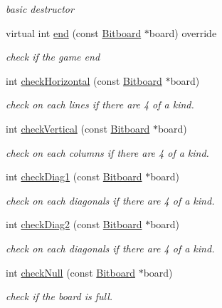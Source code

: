 \begin{DoxyCompactItemize}
\begin{DoxyCompactList}\small\item\em basic destructor \end{DoxyCompactList}\item 
virtual int \hyperlink{class_connect4_ad011fd3ade939f1d7e8e54b1ad62188e}{end} (const \hyperlink{class_bitboard}{Bitboard} $\ast$board) override
\begin{DoxyCompactList}\small\item\em check if the game end \end{DoxyCompactList}\item 
int \hyperlink{class_connect4_a390df9947d9a3dd5ad6d635e04e34ad5}{check\+Horizontal} (const \hyperlink{class_bitboard}{Bitboard} $\ast$board)
\begin{DoxyCompactList}\small\item\em check on each lines if there are 4 of a kind. \end{DoxyCompactList}\item 
int \hyperlink{class_connect4_afea80666abe65e9ede6a60e2f8ee97c3}{check\+Vertical} (const \hyperlink{class_bitboard}{Bitboard} $\ast$board)
\begin{DoxyCompactList}\small\item\em check on each columns if there are 4 of a kind. \end{DoxyCompactList}\item 
int \hyperlink{class_connect4_a5d1ec2a0b2e3748d09d0db18ba4e2b03}{check\+Diag1} (const \hyperlink{class_bitboard}{Bitboard} $\ast$board)
\begin{DoxyCompactList}\small\item\em check on each diagonals if there are 4 of a kind. \end{DoxyCompactList}\item 
int \hyperlink{class_connect4_a53cb51ebd88edd4b7805a69622900bd5}{check\+Diag2} (const \hyperlink{class_bitboard}{Bitboard} $\ast$board)
\begin{DoxyCompactList}\small\item\em check on each diagonals if there are 4 of a kind. \end{DoxyCompactList}\item 
int \hyperlink{class_connect4_a32ba5ba009d57e4906ddc1601e7fe80d}{check\+Null} (const \hyperlink{class_bitboard}{Bitboard} $\ast$board)
\begin{DoxyCompactList}\small\item\em check if the board is full. \end{DoxyCompactList}\item 

\end{DoxyCompactItemize}
